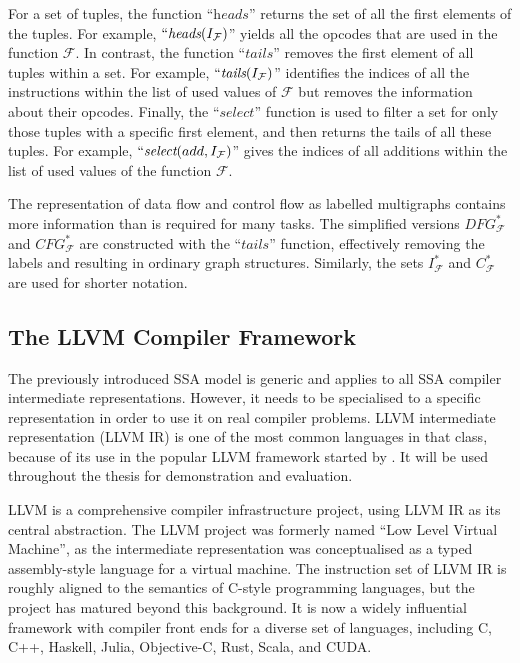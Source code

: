     For a set of tuples, the function ``$\textit{heads}$'' returns the set of
    all the first elements of the tuples.
    For example, $``\textit{heads}(I_\mathcal F)$'' yields all the opcodes that
    are used in the function $\mathcal F$.
    In contrast, the function ``$\textit{tails}$'' removes the first element of
    all tuples within a set.
    For example, $``\textit{tails}(I_\mathcal F)$'' identifies the indices of
    all the instructions within the list of used values of $\mathcal F$ but
    removes the information about their opcodes.
    Finally, the ``$\textit{select}$'' function is used to filter a set for only
    those tuples with a specific first element, and then returns the tails of
    all these tuples.
    For example, $``\textit{select}(add,I_\mathcal F)$'' gives the indices of
    all additions within the list of used values of the function $\mathcal F$.

    The representation of data flow and control flow as labelled multigraphs
    contains more information than is required for many tasks.
    The simplified versions $DFG_\mathcal F^*$ and $CFG_\mathcal F^*$ are
    constructed with the ``$\textit{tails}$'' function, effectively removing the
    labels and resulting in ordinary graph structures.
    Similarly, the sets $I_\mathcal F^*$ and $C_\mathcal F^*$ are used for
    shorter notation.

\subsection{The LLVM Compiler Framework}

    The previously introduced SSA model is generic and applies to all SSA
    compiler intermediate representations.
    However, it needs to be specialised to a specific representation in
    order to use it on real compiler problems.
    LLVM intermediate representation (LLVM IR) is one of the most common
    languages in that class, because of its use in the popular LLVM
    framework started by \citet{lattner2004llvm}.
    It will be used throughout the thesis for demonstration and evaluation.

    LLVM is a comprehensive compiler infrastructure project, using LLVM IR as
    its central abstraction.
    The LLVM project was formerly named ``Low Level Virtual Machine'', as the
    intermediate representation was conceptualised as a typed assembly-style
    language for a virtual machine.
    The instruction set of LLVM IR is roughly aligned to the semantics of
    C-style programming languages, but the project has matured beyond this
    background.
    It is now a widely influential framework with compiler front ends
    for a diverse set of languages, including C, C++, Haskell, Julia,
    Objective-C, Rust, Scala, and CUDA.

